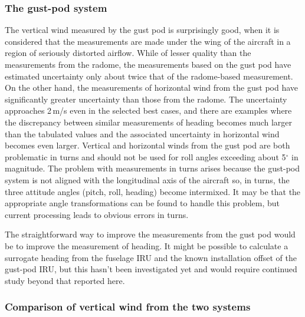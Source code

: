 \documentclass[12pt,twoside,english]{article}\usepackage[]{graphicx}\usepackage[]{color}
\let\OrgIndex\index
\renewcommand*{\index}[1]{\OrgIndex{#1}}
\begin{document}
\subsubsection{The gust-pod system}

The vertical wind measured by the gust pod is surprisingly good, when it is considered that the measurements are made under the wing of the aircraft in a region of seriously distorted airflow. While of lesser quality than the measurements from the radome, the measurements based on the gust pod have estimated uncertainty only about twice that of the radome-based measurement. On the other hand, the measurements of horizontal wind from the gust pod have significantly greater uncertainty than those from the radome. The uncertainty approaches 2\,m/s even in the selected best cases, and there are examples where the discrepancy between similar measurements of heading becomes much larger than the tabulated values and the associated uncertainty in horizontal wind becomes even larger. Vertical and horizontal winds from the gust pod are both problematic in turns and should not be used for roll angles exceeding about 5$^{\circ}$ in magnitude. The problem with measurements in turns arises because the gust-pod system is not aligned with the longitudinal axis of the aircraft so, in turns, the three attitude angles (pitch, roll, heading) become intermixed. It may be that the appropriate angle transformations can be found to handle this problem, but current processing leads to obvious errors in turns. 

The straightforward way to improve the measurements from the gust pod would be to improve the measurement of heading. It might be possible to calculate a surrogate heading from the fuselage IRU and the known installation offset of the gust-pod IRU, but this hasn't been investigated yet and would require continued study beyond that reported here.

\subsubsection{Comparison of vertical wind from the two systems}
\end{document}

